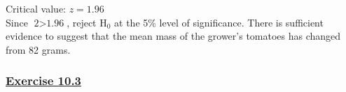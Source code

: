 \documentclass[
  11pt,
]{book}
\begin{document}
\begin{tcolorbox}[title=Example,colback=RoyalBlue!1!,colframe=RoyalBlue]
\vspace{0.2cm}

Critical value: $z=\text{1.96}$\\

Since $\text{2}>\text{1.96}$, reject $\text{H}_\text{0}$ at the 5\% level of significance. There is sufficient evidence to suggest that the mean mass of the grower's tomatoes has changed from 82 grams.

\end{tcolorbox}

\pagebreak

\label{ex103q}{}

\subsubsection*{\texorpdfstring{\hyperref[ex103a]{Exercise 10.3}}{Exercise 10.3}}\label{exercise-10.3}
\end{document}
